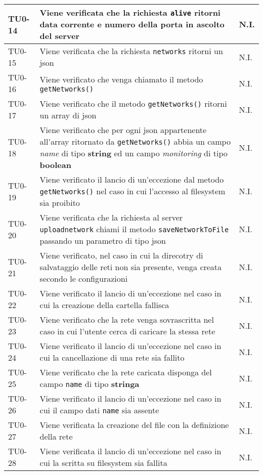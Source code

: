 \begin{longtable}{|C{.15\textwidth}|m{.65\textwidth}|C{.20\textwidth}|}
\hline
 TU0-14 & Viene verificata che la richiesta \texttt{alive} ritorni data corrente e numero della porta in ascolto del server & N.I. \\ 
\hline 
{}TU0-15 & Viene verificata che la richiesta \texttt{networks} ritorni un json & N.I. \\ 
\hline 
 TU0-16 & Viene verificato che venga chiamato il metodo \texttt{getNetworks()} & N.I. \\
\hline 
{}TU0-17 & Viene verificato che il metodo \texttt{getNetworks()} ritorni un array di json & N.I. \\ 
\hline
TU0-18 & Viene verificato che per ogni json appartenente all'array ritornato da \texttt{getNetworks()} abbia un campo \textit{name} di tipo \textbf{string} ed un campo \textit{monitoring} di tipo \textbf{boolean} & N.I. \\ 
\hline
{}TU0-19 & Viene verificato il lancio di un'eccezione dal metodo \texttt{getNetworks()} nel caso in cui l'accesso al filesystem sia proibito & N.I. \\ 
\hline 
TU0-20 & Viene verificata che la richiesta al server \texttt{uploadnetwork} chiami il metodo \texttt{saveNetworkToFile} passando un parametro di tipo json & N.I. \\ 
\hline 
{}TU0-21 & Viene verificato, nel caso in cui la direcotry di salvataggio delle reti non sia presente, venga creata secondo le configurazioni & N.I. \\ 
\hline 
 TU0-22 & Viene verificato il lancio di un'eccezione nel caso in cui la creazione della cartella fallisca & N.I. \\ 
\hline 
{}TU0-23 & Viene verificato che la rete venga sovrascritta nel caso in cui l'utente cerca di caricare la stessa rete & N.I. \\
\hline
 TU0-24 & Viene verificato il lancio di un'eccezione nel caso in cui la cancellazione di una rete sia fallito & N.I. \\ 
\hline
{}TU0-25 & Viene verificato che la rete caricata disponga del campo \texttt{name} di tipo \textbf{stringa} & N.I. \\ 
\hline 
 TU0-26 & Viene verificato il lancio di un'eccezione nel caso in cui il campo dati \texttt{name} sia assente & N.I. \\ 
\hline 
{}TU0-27	 & Viene verificata la creazione del file con la definizione della rete & N.I. \\ 
\hline 
 TU0-28 & Viene verificata il lancio di un'eccezione nel caso in cui la scritta su filesystem sia fallita & N.I. \\ 

\end{longtable}
